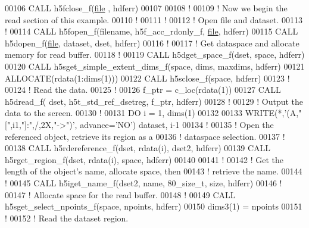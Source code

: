 \begin{DoxyCode}
00106   \textcolor{keyword}{CALL }h5fclose\_f(\hyperlink{structfile}{file} , hdferr)
00107 
00108   \textcolor{comment}{!}
00109   \textcolor{comment}{! Now we begin the read section of this example.}
00110   \textcolor{comment}{!}
00111   \textcolor{comment}{!}
00112   \textcolor{comment}{! Open file and dataset.}
00113   \textcolor{comment}{!}
00114   \textcolor{keyword}{CALL }h5fopen\_f(filename, h5f\_acc\_rdonly\_f, \hyperlink{structfile}{file}, hdferr)
00115   \textcolor{keyword}{CALL }h5dopen\_f(\hyperlink{structfile}{file}, dataset, dset, hdferr)
00116   \textcolor{comment}{!}
00117   \textcolor{comment}{! Get dataspace and allocate memory for read buffer.}
00118   \textcolor{comment}{!}
00119   \textcolor{keyword}{CALL }h5dget\_space\_f(dset, space, hdferr)
00120   \textcolor{keyword}{CALL }h5sget\_simple\_extent\_dims\_f(space, dims, maxdims, hdferr)
00121   \textcolor{keyword}{ALLOCATE}(rdata(1:dims(1)))
00122   \textcolor{keyword}{CALL }h5sclose\_f(space, hdferr)
00123   \textcolor{comment}{!}
00124   \textcolor{comment}{! Read the data.}
00125   \textcolor{comment}{!}
00126   f\_ptr = c\_loc(rdata(1))
00127   \textcolor{keyword}{CALL }h5dread\_f( dset, h5t\_std\_ref\_dsetreg, f\_ptr, hdferr)
00128   \textcolor{comment}{!}
00129   \textcolor{comment}{! Output the data to the screen.}
00130   \textcolor{comment}{!}
00131   \textcolor{keywordflow}{DO} i = 1, dims(1)
00132      
00133      \textcolor{keyword}{WRITE}(*,\textcolor{stringliteral}{'(A,"[",i1,"]:",/,2X,"->")'}, advance=\textcolor{stringliteral}{'NO'}) dataset, i-1
00134      \textcolor{comment}{!}
00135      \textcolor{comment}{! Open the referenced object, retrieve its region as a}
00136      \textcolor{comment}{! dataspace selection.}
00137      \textcolor{comment}{!}
00138      \textcolor{keyword}{CALL }h5rdereference\_f(dset, rdata(i), dset2, hdferr)
00139      \textcolor{keyword}{CALL }h5rget\_region\_f(dset, rdata(i), space, hdferr)
00140   
00141      \textcolor{comment}{!}
00142      \textcolor{comment}{! Get the length of the object's name, allocate space, then}
00143      \textcolor{comment}{! retrieve the name.}
00144      \textcolor{comment}{!}
00145      \textcolor{keyword}{CALL }h5iget\_name\_f(dset2, name, 80\_size\_t, \textcolor{keyword}{size}, hdferr)
00146      \textcolor{comment}{!}
00147      \textcolor{comment}{! Allocate space for the read buffer.}
00148      \textcolor{comment}{!}
00149      \textcolor{keyword}{CALL }h5sget\_select\_npoints\_f(space, npoints, hdferr)
00150      dims3(1) = npoints
00151      \textcolor{comment}{!}
00152      \textcolor{comment}{! Read the dataset region.}

\end{DoxyCode}
